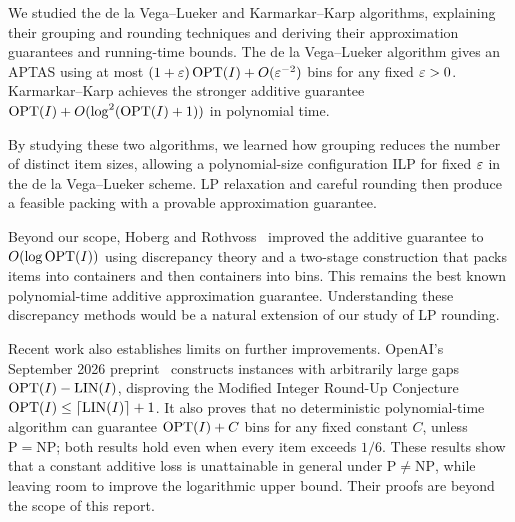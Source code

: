 We studied the de la Vega--Lueker and Karmarkar--Karp algorithms,
explaining their grouping and rounding techniques and deriving their
approximation guarantees and running-time bounds. The de la Vega--Lueker
algorithm gives an APTAS using at most
$(1+\varepsilon)\operatorname{OPT}(I)+O(\varepsilon^{-2})$ bins for any fixed $\varepsilon>0$.
Karmarkar--Karp achieves the stronger additive guarantee
$\operatorname{OPT}(I)+O(\log^2(\operatorname{OPT}(I)+1))$ in polynomial time.

By studying these two algorithms, we learned how grouping reduces the number of distinct item sizes, allowing a polynomial-size configuration ILP for fixed $\varepsilon$ in the
de la Vega--Lueker scheme. LP relaxation and careful rounding then
produce a feasible packing with a provable approximation guarantee.

Beyond our scope, Hoberg and Rothvoss~\cite{hobergLogarithmicAdditive2017}
improved the additive guarantee to $O(\log\operatorname{OPT}(I))$ using discrepancy
theory and a two-stage construction that packs items into containers
and then containers into bins. This remains the best known polynomial-time
additive approximation guarantee.
Understanding these discrepancy methods would be a natural extension
of our study of LP rounding.

Recent work also establishes limits on further improvements.
OpenAI's September 2026 preprint~\cite{openaiAdditiveHardness2026}
constructs instances with arbitrarily large gaps
$\operatorname{OPT}(I)-\operatorname{LIN}(I)$, disproving the Modified Integer Round-Up
Conjecture $\operatorname{OPT}(I)\le\lceil\operatorname{LIN}(I)\rceil+1$.
It also proves that no deterministic polynomial-time algorithm can
guarantee $\operatorname{OPT}(I)+C$ bins for any fixed constant $C$, unless
$\mathrm{P}=\mathrm{NP}$; both results hold even when every item
exceeds $1/6$. These results show that a constant additive loss is
unattainable in general under $\mathrm{P}\ne\mathrm{NP}$, while leaving
room to improve the logarithmic upper bound. Their proofs are beyond
the scope of this report.
